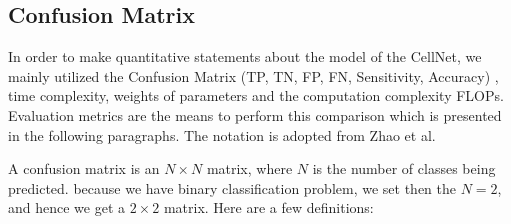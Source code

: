 \subsection{Confusion Matrix}
In order to make quantitative statements about the model of  the CellNet, we mainly utilized the  Confusion Matrix (TP, TN, FP, FN, Sensitivity, Accuracy) , time complexity, weights of parameters and the computation complexity FLOPs. 
Evaluation metrics are the means to perform this comparison which is presented in the following paragraphs. The notation is adopted from Zhao et al.

A confusion matrix is an $N \times N$ matrix, where $N$ is the number of classes being predicted. because we have binary classification problem, we set then the $N=2$, and hence we get a $2 \times 2$ matrix. Here are a few definitions:


\begin{table}[h]
\centering
{}

\caption{\textbf{The illustration of  Confusion Matrix}. We will use the precision and recall as evaluation matrix in our experiments.}

\end{table}

